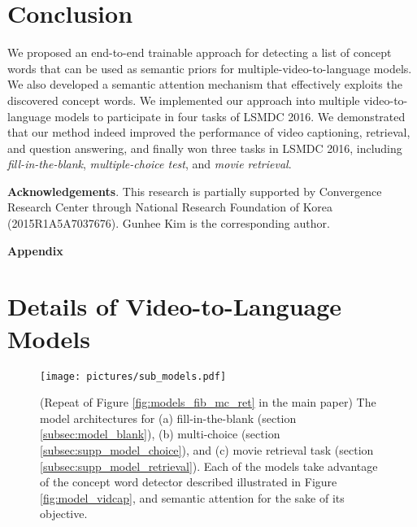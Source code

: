 \documentclass[10pt,twocolumn,letterpaper]{article}
\theoremstyle{nonumberplain}
\begin{document}
\section{Conclusion}
\label{sec:conclusion}
\vspace{-2pt}
We proposed an end-to-end trainable approach for detecting a list of concept words that can be used as semantic priors for multiple-video-to-language models.
We also developed a semantic attention mechanism that effectively exploits the discovered concept words.
We implemented our approach into multiple video-to-language models to participate in four tasks of LSMDC 2016.
We demonstrated that our method indeed improved the performance of video captioning, retrieval, and question answering, and finally
won three tasks in LSMDC 2016, including\, \textit{fill-in-the-blank}, \textit{multiple-choice test}, and \textit{movie retrieval}.

\medskip\noindent\textbf{Acknowledgements}.
This research is partially supported by Convergence Research Center through National Research Foundation of Korea (2015R1A5A7037676).
Gunhee Kim is the corresponding author.



{\small


}

\clearpage
\appendix

\maketitle\thispagestyle{empty}

{\noindent\bf\Large Appendix}
\bigskip

\section{Details of Video-to-Language Models}
\label{sec:supp_v2l_models}

\begin{figure*}\centering
\texttt{[image: pictures/sub\_models.pdf]}
\vspace{5pt}
\caption{
    (Repeat of Figure \ref{fig:models_fib_mc_ret} in the main paper)
    The model architectures for
    (a) fill-in-the-blank (section \ref{subsec:model_blank}),
    (b) multi-choice (section \ref{subsec:supp_model_choice}),
    and (c) movie retrieval task (section \ref{subsec:supp_model_retrieval}).
Each of the models take advantage of the concept word detector described
illustrated in Figure \ref{fig:model_vidcap},
and semantic attention for the sake of its objective.
}

\label{fig:supp_models_fib_mc_ret}
\vspace{-5pt}
\end{figure*}
\end{document}

